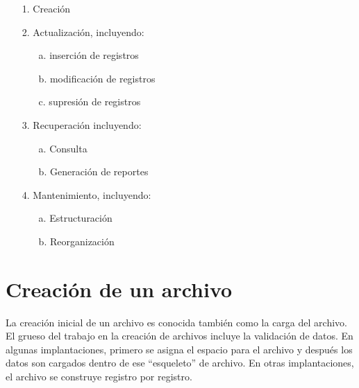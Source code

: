 \begin{itemize}
\item[1.] Creación
\item[2.] Actualización, incluyendo:
\begin{itemize}
\item[a.] inserción de registros
\item[b.] modificación de registros
\item[c.] supresión de registros
\end{itemize}
\item[3.] Recuperación incluyendo:
\begin{itemize}
\item[a.] Consulta
\item[b.] Generación de reportes
\end{itemize}
\item[4.] Mantenimiento, incluyendo:
\begin{itemize}
\item[a. ] Estructuración 
\item[b. ] Reorganización
\end{itemize}
\end{itemize}

\section{Creación de un archivo}

La creación inicial de un archivo es conocida también como la carga del archivo.
El grueso del trabajo en la creación de archivos incluye la validación de datos. En algunas implantaciones, primero se asigna el espacio para el archivo y después los datos son cargados dentro de ese “esqueleto” de archivo. En otras implantaciones, el archivo se construye registro por registro.

